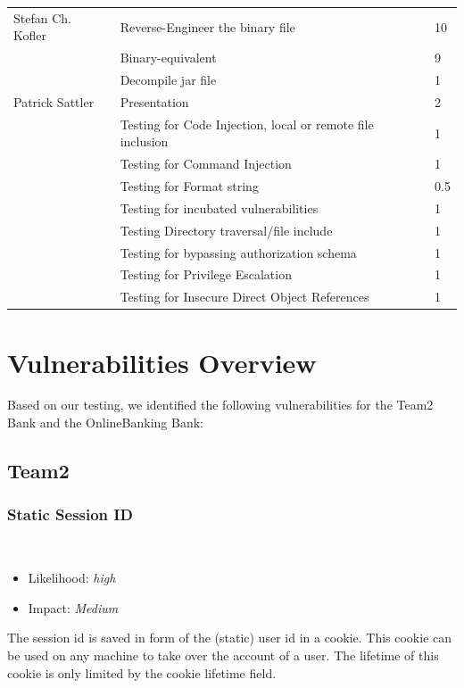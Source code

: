 \documentclass[headsepline,footsepline,footinclude=false,oneside,fontsize=11pt,paper=a4,listof=totoc,bibliography=totoc]{scrbook} %
\begin{document}
\begin{table}[htb]
{\begin{tabular}{lll}
		\hline
		\hline
		Stefan Ch. Kofler & Reverse-Engineer the binary file & 10\\
		& Binary-equivalent & 9 \\
		& Decompile jar file & 1 \\
		\hline
		\hline
		Patrick Sattler &  Presentation & 2 \\		 
		& Testing for Code Injection, local or remote file inclusion & 1 \\
		& Testing for Command Injection & 1 \\
		& Testing for Format string & 0.5 \\
		& Testing for incubated vulnerabilities & 1 \\ 
	    & Testing Directory traversal/file include & 1\\
		& Testing for bypassing authorization schema & 1\\
		& Testing for Privilege Escalation & 1\\
		& Testing for Insecure Direct Object References & 1\\
		
	\end{tabular}%
}
\end{table}

%

\chapter{Vulnerabilities Overview}
Based on our testing, we identified the following vulnerabilities for the Team2
Bank and the OnlineBanking Bank:
\section{Team2}

\subsection{Static Session ID} \
\begin{itemize}
	\item Likelihood: \textit{high}
	\item Impact: \textit{Medium} 
\end{itemize}

The session id is saved in form of the (static) user id in a cookie. This cookie can be used on any machine
to take over the account of a user. The lifetime of this cookie is only limited by the cookie lifetime field.
\end{document}
